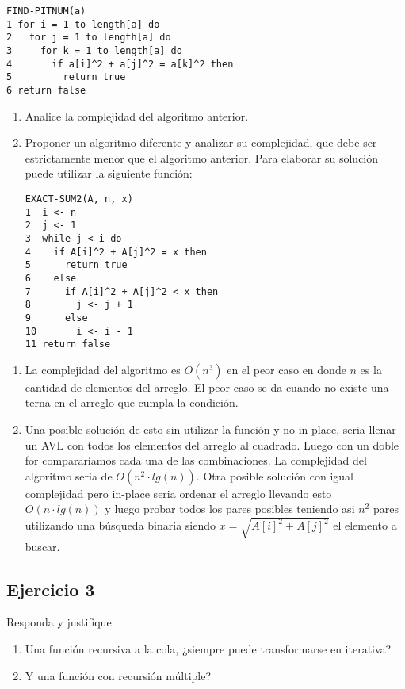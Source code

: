 \documentclass[10pt, a4paper]{article}
\begin{document}
\begin{verbatim}
FIND-PITNUM(a)
1 for i = 1 to length[a] do
2   for j = 1 to length[a] do
3     for k = 1 to length[a] do
4       if a[i]^2 + a[j]^2 = a[k]^2 then
5         return true
6 return false
\end{verbatim}

\begin{enumerate}
 \item Analice la complejidad del algoritmo anterior.
 \item Proponer un algoritmo diferente y analizar su complejidad, que debe ser estrictamente menor que el algoritmo anterior. Para elaborar su soluci\'on puede utilizar la siguiente funci\'on:

 \begin{verbatim}
EXACT-SUM2(A, n, x)
1  i <- n
2  j <- 1
3  while j < i do
4    if A[i]^2 + A[j]^2 = x then
5      return true
6    else
7      if A[i]^2 + A[j]^2 < x then
8        j <- j + 1
9      else
10       i <- i - 1
11 return false
\end{verbatim}

\end{enumerate}

\begin{enumerate}
 \item La complejidad del algoritmo es $O(n^3)$ en el peor caso en donde $n$ es la cantidad de elementos del arreglo. El peor caso se da cuando no existe una terna en el arreglo que cumpla la condici\'on.
 \item Una posible soluci\'on de esto sin utilizar la funci\'on y no in-place, seria llenar un AVL con todos los elementos del arreglo al cuadrado. Luego con un doble for comparar\'iamos cada una de las combinaciones. La complejidad del algoritmo seria de $O(n^2 \cdot lg(n))$. Otra posible soluci\'on con igual complejidad pero in-place seria ordenar el arreglo llevando esto $O(n \cdot lg(n))$ y luego probar todos los pares posibles teniendo asi $n^2$ pares utilizando una b\'usqueda binaria siendo $x = \sqrt{A[i]^2+A[j]^2}$ el elemento a buscar.
\end{enumerate}



\subsection*{Ejercicio 3}
Responda y justifique:
\begin{enumerate}
 \item Una funci\'on recursiva a la cola, ¿siempre puede transformarse en iterativa?
 \item Y una funci\'on con recursi\'on m\'ultiple?
\end{enumerate}
\end{document}
